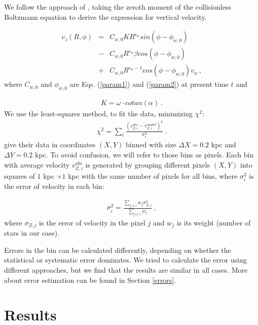 \documentclass[twocolumn]{aastex63}
\begin{document}
We follow the approach of , taking the zeroth moment of the collisionless Boltzmann equation to derive the expression for vertical velocity.

\begin{eqnarray}\label{model}
v_z(R,\phi)&=&C_{w,0}K R^{\epsilon_w}sin(\phi-\phi_{w,0}) \nonumber \\
&-&C_{w,0}R^{\epsilon_w}\beta cos(\phi-\phi_{w,0}) \\
&+&C_{w,0}R^{\epsilon_w-1}cos(\phi-\phi_{w,0})v_{\phi}~, \nonumber
\end{eqnarray}	
where $C_{w,0}$ and $\phi_{w,0}$ are Eqs. (\ref{param1}) and (\ref{param2}) at present time $t$ and

\begin{eqnarray}
K=\omega \cdot cotan(\alpha)~.
\end{eqnarray}
We use the least-squares method, to fit the data, minimizing $\chi^2$: 
\begin{eqnarray}
{\chi^2=\sum_{i} \frac{(v^{obs}_{Z,i}-v^{model}_{Z,i})^2}{\sigma^2_i}~.}
\end{eqnarray}
\cite{martin} give their data in coordinates $(X,Y)$ binned with size $\Delta X=0.2$ kpc and $\Delta Y=0.2$ kpc. To avoid confusion, we will refer to those bins as pixels. Each bin with average velocity $v^{obs}_{Z,i}$ is generated by grouping different pixels $(X,Y)$ into squares of $1$ kpc $\times 1$ kpc with the same number of pixels for all bins, where $\sigma^2_i$ is the error of velocity in each bin:

\begin{eqnarray}\label{err}
{\sigma^2_i=\frac{\sum_{j\in i} w_j \sigma_{Z,j}^2}{\sum_{j \in i} w_j}~,}
\end{eqnarray}
where $\sigma_{Z,j}$ is the error of velocity in the pixel $j$ and $w_j$ is its weight (number of stars in our case).

Errors in the bin can be calculated differently, depending on whether the statistical or systematic error dominates. We tried to calculate the error using different approaches, but we find that the results are similar in all cases. More about error estimation can be found in Section \ref{errors}.

\section{Results}
\end{document}
